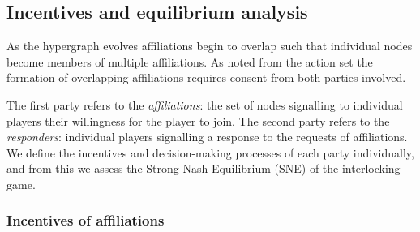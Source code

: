 \begin{subappendices}
%

\subsection{Incentives and equilibrium analysis}

As the hypergraph evolves affiliations begin to overlap such that individual nodes become members of multiple affiliations. As noted from the action set the formation of overlapping affiliations requires consent from both parties involved.

The first party refers to the \emph{affiliations}: the set of nodes signalling to individual players their willingness for the player to join. The second party refers to the \emph{responders}: individual players signalling a response to the requests of affiliations. We define the incentives and decision-making processes of each party individually, and from this we assess the Strong Nash Equilibrium (SNE) of the interlocking game.

\subsubsection*{Incentives of affiliations}


\end{subappendices}
